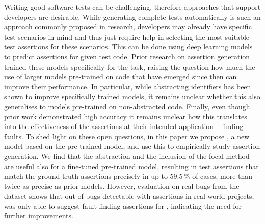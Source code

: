 Writing good software tests can be challenging, therefore approaches
that support developers are desirable. While generating complete tests
automatically is such an approach commonly proposed in research,
developers may already have specific test scenarios in mind and thus
just require help in selecting the most suitable test assertions for
these scenarios. This can be done using deep learning models to
predict assertions for given test code.
Prior research on assertion generation trained these models
specifically for the task, raising the question how much the use of
larger models pre-trained on code that have emerged since then can
improve their performance. In particular, while abstracting
identifiers has been shown to improve specifically trained models, it
remains unclear whether this also generalises to models pre-trained on
non-abstracted code. Finally, even though prior work demonstrated high
accuracy it remains unclear how this translates into the effectiveness
of the assertions at their intended application -- finding faults.
To shed light on these open questions, in this paper we propose
\assertfive, a new model based on the pre-trained \codetfive model,
and use this to empirically study assertion generation.
We find that the abstraction and the inclusion of the focal method are
useful also for a fine-tuned pre-trained model, resulting in test
assertions that match the ground truth assertions precisely in up to
59.5\,\% of cases, more than twice as precise as prior models.
However, evaluation on real bugs from the  dataset shows
that out of \dfjAssertionLocationInTestTotalBugs{} bugs detectable
with assertions in real-world projects, \assertfive was only able to
suggest fault-finding assertions for \dfjRawFoundBugs, indicating the
need for further improvements.


